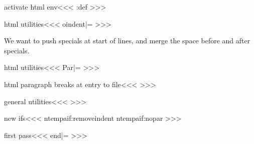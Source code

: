 \<activate html env\><<<
\edef\NoHtmlEnv{\NoHtmlEnv}%
\append:def\NoHtmlEnv{\SUBOff \SUPOff}\HtmlEnv
>>>

\<html utilities\><<<
\let\:noindent|=\noindent
\def\noindent{\ifx \EndPicture\:UnDef
     \ifvmode  \IgnoreIndent\leavevmode\fi
   \else \:noindent \fi}
>>>


We want to push specials at start of lines, and merge the space before
and after specials.

\<html utilities\><<<
\let\skip:Par|=\empty
>>>




\<html paragraph breaks at entry to file\><<<
\def\HtmlPar{\HtmlPar:Off{%
   \if:nopar \ShowPar \ShowIndent
      \ifx \skip:Par\empty\else \hskip -\parindent \skip:Par\fi
   \else 
     \if:removeindent \ShowIndent \hskip -\parindent \a:Par
     \else 
        \ifdim \parindent>\z@ \hskip -\parindent \fi 
        \html:par
        \ifdim \parindent>\z@ \hskip  \parindent \fi
   \fi\fi \relax
}}%
>>>


\<general utilities\><<<
\def\IgnorePar{\ifx \EndPicture\:UnDef \Protect\gl:nopartrue \fi}
\def\ShowPar{\ifx \EndPicture\:UnDef \Protect\gl:noparfalse \fi}
\def\IgnoreIndent{\ifx \EndPicture\:UnDef 
   \Protect\gl:removeindenttrue \fi}
\def\ShowIndent{\ifx \EndPicture\:UnDef 
   \Protect\gl:removeindentfalse \fi}
\def\gl:nopartrue{\global\:nopartrue}
\def\gl:noparfalse{\global\:noparfalse}
\def\gl:removeindenttrue{\global\:removeindenttrue}
\def\gl:removeindentfalse{\global\:removeindentfalse}
\def\HtmlParOff{\global\let\HtmlPar:Off|=\:gobble}
\def\HtmlParOn{\gdef\HtmlPar:Off##1{##1}}
\HtmlParOn
>>>





\<new ifs\><<<
\:tempa{if:removeindent}
\:tempa{if:nopar}
>>>




\<first pass\><<<
\def\c:HtmlPar:#1#2#3#4{%
   \def\:temp{#3}\ifx \:temp\empty \c:def\a:Par{#1}\else
     \c:def\a:Par{#1\Next:EndP{#3}}\fi
   \def\:temp{#4}\ifx \:temp\empty \c:def\html:par{#2}\else
     \c:def\html:par{#2\Next:EndP{#4}}\fi
}
\def\EndP{\Protect\par:end}
\let\par:end|=\empty
\def\Next:EndP{\Protect\next:endp}
\def\next:endp#1{\gdef\par:end{#1\global\let\par:end|=\empty}}
\def\SaveHtmlPar{\PushMacro\a:Par \PushMacro\html:par}
\def\RecallHtmlPar{\PopMacro\a:Par \PopMacro\html:par}
>>>


